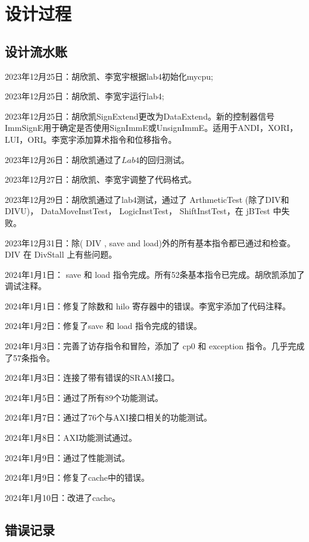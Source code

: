 \section{设计过程}
\subsection{设计流水账}
2023年12月25日：胡欣凯、李宽宇根据lab4初始化mycpu;

2023年12月25日：胡欣凯、李宽宇运行lab4;

2023年12月25日：胡欣凯SignExtend更改为DataExtend。新的控制器信号ImmSignE用于确定是否使用SignImmE或UnsignImmE。适用于ANDI，XORI，LUI，ORI。李宽宇添加算术指令和位移指令。

2023年12月26日：胡欣凯通过了$Lab4$的回归测试。

2023年12月27日：胡欣凯、李宽宇调整了代码格式。

2023年12月29日：胡欣凯通过了lab4测试，通过了 ArthmeticTest (除了DIV和DIVU)， DataMoveInstTest， LogicInstTest， ShiftInstTest，在 jBTest 中失败。

2023年12月31日：除( DIV , save and load)外的所有基本指令都已通过和检查。 DIV 在 DivStall 上有些问题。

2024年1月1日： save 和 load 指令完成。所有52条基本指令已完成。胡欣凯添加了调试注释。

2024年1月1日：修复了除数和 hilo 寄存器中的错误。李宽宇添加了代码注释。

2024年1月2日：修复了save 和 load 指令完成的错误。

2024年1月3日：完善了访存指令和冒险，添加了 cp0 和 exception 指令。几乎完成了57条指令。

2024年1月3日：连接了带有错误的SRAM接口。

2024年1月5日：通过了所有89个功能测试。

2024年1月7日：通过了76个与AXI接口相关的功能测试。

2024年1月8日：AXI功能测试通过。

2024年1月9日：通过了性能测试。

2024年1月9日：修复了cache中的错误。

2024年1月10日：改进了cache。

\subsection{错误记录}

